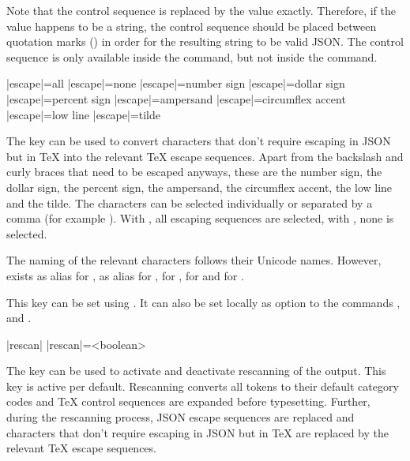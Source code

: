 \documentclass[a4paper]{article}
\begin{document}
{{\begin{codeexamplecolumns}


\end{codeexamplecolumns}

\warning Note that the control sequence \macro{\$} is replaced by the value exactly. Therefore, if the value happens to be a string, the control sequence \macro{\$} should be placed between quotation marks () in order for the resulting string to be valid JSON. The control sequence \macro{\$} is only available inside the \macro{\JSONParse} command, but not inside the \macro{\JSONParseFromFile} command.

\begin{macrodef}
|escape|={all}
|escape|={none}
|escape|={number sign}
|escape|={dollar sign}
|escape|={percent sign}
|escape|={ampersand}
|escape|={circumflex accent}
|escape|={low line}
|escape|={tilde}
\end{macrodef}
The key  can be used to convert characters that don't require escaping in JSON but in TeX into the relevant TeX escape sequences. Apart from the backslash and curly braces that need to be escaped anyways, these are the number sign, the dollar sign, the percent sign, the ampersand, the circumflex accent, the low line and the tilde. The characters can be selected individually or separated by a comma (for example ). With , all escaping sequences are selected, with , none is selected.

The naming of the relevant characters follows their Unicode names. However,  exists as alias for ,  as alias for ,  for ,  for  and  for .

This key can be set using \macro{\JSONParseSet}. It can also be set locally as option to the commands \macro{\JSONParseValue}, \macro{\JSONParseArrayUse} and \macro{\JSONParseArrayMapFunction}.

\begin{macrodef}
|rescan|
|rescan|={<boolean>}
\end{macrodef}
The key  can be used to activate and deactivate rescanning of the output. This key is active per default. Rescanning converts all tokens to their default category codes and TeX control sequences are expanded before typesetting. Further, during the rescanning process, JSON escape sequences are replaced and characters that don't require escaping in JSON but in TeX are replaced by the relevant TeX escape sequences.

}}
\end{document}
